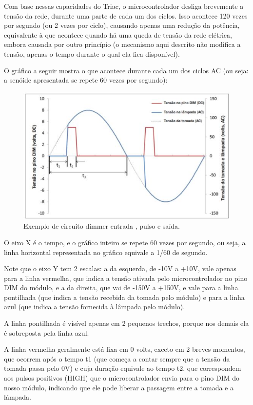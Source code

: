  Com base nessas capacidades do Triac, o microcontrolador desliga brevemente a tensão da rede, durante uma parte de cada um dos ciclos. Isso acontece 120 vezes por segundo (ou 2 vezes por ciclo), causando apenas uma redução da potência, equivalente à que acontece quando há uma queda de tensão da rede elétrica, embora causada por outro princípio (o mecanismo aqui descrito não modifica a tensão, apenas o tempo durante o qual ela fica disponível).
 
O gráfico a seguir mostra o que acontece durante cada um dos ciclos AC (ou seja: a senóide apresentada se repete 60 vezes por segundo):

		\begin{figure}[H]
			\begin{center}
				\includegraphics[scale = 1]{figuras/Grafico_Dimmer}
				\caption{Exemplo de circuito dimmer entrada , pulso e saída.}
			\end{center}
		\end{figure}

O eixo X é o tempo, e o gráfico inteiro se repete 60 vezes por segundo, ou seja, a linha horizontal representada no gráfico equivale a 1/60 de segundo.

Note que o eixo Y tem 2 escalas: a da esquerda, de -10V a +10V, vale apenas para a linha vermelha, que indica a tensão ativada pelo microcontrolador no pino DIM do módulo, e a da direita, que vai de -150V a +150V, e vale para a linha pontilhada (que indica a tensão recebida da tomada pelo módulo) e para a linha azul (que indica a tensão fornecida à lâmpada pelo módulo).

A linha pontilhada é visível apenas em 2 pequenos trechos, porque nos demais ela é sobreposta pela linha azul.

A linha vermelha geralmente está fixa em 0 volts, exceto em 2 breves momentos, que ocorrem após o tempo t1 (que começa a contar sempre que a tensão da tomada passa pelo 0V) e cuja duração equivale ao tempo t2, que correspondem aos pulsos positivos (HIGH) que o microcontrolador envia para o pino DIM do nosso módulo, indicando que ele pode liberar a passagem entre a tomada e a lâmpada.

